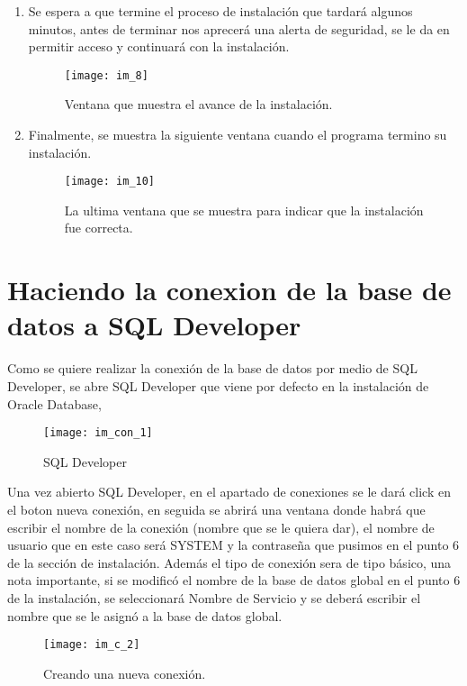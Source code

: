 \documentclass[10pt]{article}
\begin{document}
\begin{enumerate}
		
		\item Se espera a que termine el proceso de instalación que tardará algunos minutos, antes de terminar nos aprecerá una alerta de seguridad, se le da en permitir acceso y continuará con la instalación.\\
		
		\begin{figure}[H]
			\centering
		\texttt{[image: im\_8]}
		\caption{Ventana que muestra el avance de la instalación.}
	    \end{figure}
		
		\item Finalmente, se muestra la siguiente ventana cuando el programa termino su instalación.\\
		
		\begin{figure}[H]
			\centering
		\texttt{[image: im\_10]}
		\caption{La ultima ventana que se muestra para indicar que la instalación fue correcta.}
	    \end{figure}
	\end{enumerate}
	
	
	\section{Haciendo la conexion de la base de datos a SQL Developer}
	
	Como se quiere realizar la conexión de la base de datos por medio de SQL Developer, se abre SQL Developer que viene por defecto en la instalación de Oracle Database,\\
	\begin{figure}[H]
		\centering
	\texttt{[image: im\_con\_1]}
	\caption{SQL Developer}
    \end{figure}
	
	Una vez abierto SQL Developer, en el apartado de conexiones se le dará click en el boton nueva conexión, en seguida se abrirá una ventana donde habrá que escribir el nombre de la conexión (nombre que se le quiera dar), el nombre de usuario que en este caso será SYSTEM y la contraseña que pusimos en el punto 6 de la sección de instalación. Además el tipo de conexión sera de tipo básico, una nota importante, si se modificó el nombre de la base de datos global en el punto 6 de la instalación, se seleccionará Nombre de Servicio y se deberá escribir el nombre que se le asignó a la base de datos global.\\
	\begin{figure}[H]
		\centering
	\texttt{[image: im\_c\_2]}
	\caption{Creando una nueva conexión.}
    \end{figure}
	
\end{document}
